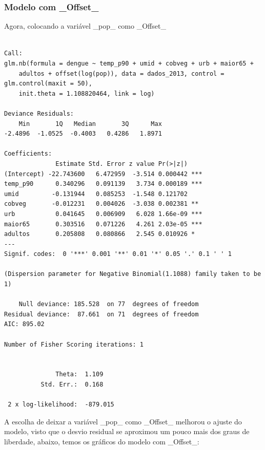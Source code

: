 \documentclass[12pt,a4paper]{article}\usepackage[]{graphicx}\usepackage[]{color}
\makeatletter
\newenvironment{kframe}{%
 \def\at@end@of@kframe{}%
 \ifinner\ifhmode%
  \def\at@end@of@kframe{\end{minipage}}%
  \begin{minipage}{\columnwidth}%
 \fi\fi%
 \def\FrameCommand##1{\hskip\@totalleftmargin \hskip-\fboxsep
 \colorbox{shadecolor}{##1}\hskip-\fboxsep
     \hskip-\linewidth \hskip-\@totalleftmargin \hskip\columnwidth}%
 \MakeFramed {\advance\hsize-\width
   \@totalleftmargin\z@ \linewidth\hsize
   \@setminipage}}%
 {\par\unskip\endMakeFramed%
 \at@end@of@kframe}
\newenvironment{knitrout}{}{} %
\makeatother
\begin{document}
\subsubsection{\textbf{Modelo com \_Offset\_}}
Agora, colocando a variável \_pop\_ como \_Offset\_
\begin{knitrout}
\color{fgcolor}\begin{kframe}
\begin{verbatim}

Call:
glm.nb(formula = dengue ~ temp_p90 + umid + cobveg + urb + maior65 + 
    adultos + offset(log(pop)), data = dados_2013, control = glm.control(maxit = 50), 
    init.theta = 1.108820464, link = log)

Deviance Residuals: 
    Min       1Q   Median       3Q      Max  
-2.4896  -1.0525  -0.4003   0.4286   1.8971  

Coefficients:
              Estimate Std. Error z value Pr(>|z|)    
(Intercept) -22.743600   6.472959  -3.514 0.000442 ***
temp_p90      0.340296   0.091139   3.734 0.000189 ***
umid         -0.131944   0.085253  -1.548 0.121702    
cobveg       -0.012231   0.004026  -3.038 0.002381 ** 
urb           0.041645   0.006909   6.028 1.66e-09 ***
maior65       0.303516   0.071226   4.261 2.03e-05 ***
adultos       0.205808   0.080866   2.545 0.010926 *  
---
Signif. codes:  0 '***' 0.001 '**' 0.01 '*' 0.05 '.' 0.1 ' ' 1

(Dispersion parameter for Negative Binomial(1.1088) family taken to be 1)

    Null deviance: 185.528  on 77  degrees of freedom
Residual deviance:  87.661  on 71  degrees of freedom
AIC: 895.02

Number of Fisher Scoring iterations: 1


              Theta:  1.109 
          Std. Err.:  0.168 

 2 x log-likelihood:  -879.015 
\end{verbatim}
\end{kframe}
\end{knitrout}
A escolha de deixar a variável \_pop\_ como \_Offset\_ melhorou o ajuste do modelo, visto que o desvio residual se aproximou um pouco mais dos graus de liberdade, abaixo, temos os gráficos do modelo com \_Offset\_:
\end{document}
